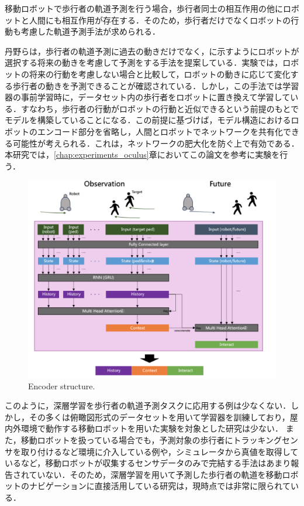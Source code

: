 \protect{}

\newpage

移動ロボットで歩行者の軌道予測を行う場合，歩行者同士の相互作用の他にロボットと人間にも相互作用が存在する．そのため，歩行者だけでなくロボットの行動も考慮した軌道予測手法が求められる．

丹野ら\cite{si2023-tanno}は，歩行者の軌道予測に過去の動きだけでなく，に示すようにロボットが選択する将来の動きを考慮して予測をする手法を提案している．実験では，ロボットの将来の行動を考慮しない場合と比較して，ロボットの動きに応じて変化する歩行者の動きを予測できることが確認されている．しかし，この手法では学習器の事前学習時に，データセット内の歩行者をロボットに置き換えて学習している．すなわち，歩行者の行動がロボットの行動と近似できるという前提のもとでモデルを構築していることになる．この前提に基づけば，モデル構造におけるロボットのエンコード部分を省略し，人間とロボットでネットワークを共有化できる可能性が考えられる．これは，ネットワークの肥大化を防ぐ上で有効である．
本研究では，\ref{chap:experiments_oculus}章においてこの論文\cite{si2023-tanno}を参考に実験を行う．
\begin{figure}[hbtp]
     \centering
    \includegraphics[keepaspectratio, scale=0.64]
         {images/future-robot.png}
    \caption{Encoder structure.\protect\footnotemark[5]}
    \label{Fig:future-robot}
\end{figure}
\protect{}

このように，深層学習を歩行者の軌道予測タスクに応用する例は少なくない．しかし，その多くは俯瞰図形式のデータセットを用いて学習器を訓練しており，屋内外環境で動作する移動ロボットを用いた実験を対象とした研究は少ない．
また，移動ロボットを扱っている場合でも，予測対象の歩行者にトラッキングセンサを取り付けるなど環境に介入している例や，シミュレータから真値を取得しているなど，移動ロボットが収集するセンサデータのみで完結する手法はあまり報告されていない．そのため，深層学習を用いて予測した歩行者の軌道を移動ロボットのナビゲーションに直接活用している研究は，現時点では非常に限られている．

\newpage